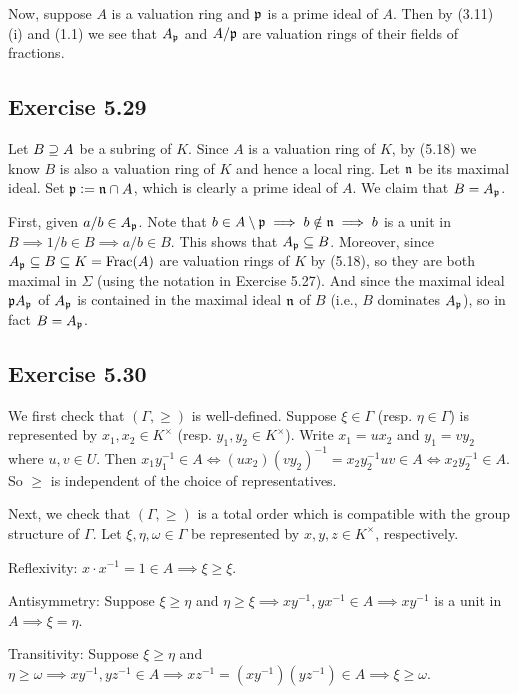 \documentclass[../A&M.tex]{subfiles}
\begin{document}
Now, suppose $A$ is a valuation ring and $\mathfrak{p}$ is a prime ideal of $A$. Then by (3.11) (i) and (1.1) we see that $A_{\mathfrak{p}}$ and $A/\mathfrak{p}$ are valuation rings of their fields of fractions.

\subsection*{Exercise 5.29}

Let $B \supseteq A$ be a subring of $K$. Since $A$ is a valuation ring of $K$, by (5.18) we know $B$ is also a valuation ring of $K$ and hence a local ring. Let $\mathfrak{n}$ be its maximal ideal. Set $\mathfrak{p} := \mathfrak{n} \cap A$, which is clearly a prime ideal of $A$. We claim that $B = A_{\mathfrak{p}}$.

First, given $a/b \in A_{\mathfrak{p}}$. Note that $b \in A \setminus \mathfrak{p} \implies b \notin \mathfrak{n} \implies b$ is a unit in $B \implies 1/b \in B \implies a/b \in B$. This shows that $A_{\mathfrak{p}} \subseteq B$. Moreover, since $A_{\mathfrak{p}} \subseteq B \subseteq K = \operatorname{Frac}(A)$ are valuation rings of $K$ by (5.18), so they are both maximal in $\Sigma$ (using the notation in Exercise 5.27). And since the maximal ideal $\mathfrak{p} A_{\mathfrak{p}}$ of $A_{\mathfrak{p}}$ is contained in the maximal ideal $\mathfrak{n}$ of $B$ (i.e., $B$ dominates $A_{\mathfrak{p}}$), so in fact $B = A_{\mathfrak{p}}$.

\subsection*{Exercise 5.30}

We first check that $(\Gamma,\geq)$ is well-defined. Suppose $\xi \in \Gamma$ (resp. $\eta \in \Gamma$) is represented by $x_1,x_2 \in K^\times$ (resp. $y_1,y_2 \in K^\times$). Write $x_1=ux_2$ and $y_1=vy_2$ where $u,v \in U$. Then $x_1y_1^{-1} \in A \iff (ux_2)(vy_2)^{-1} = x_2y_2^{-1} uv \in A \iff x_2y_2^{-1} \in A$. So $\geq$ is independent of the choice of representatives.

Next, we check that $(\Gamma,\geq)$ is a total order which is compatible with the group structure of $\Gamma$. Let $\xi,\eta,\omega \in \Gamma$ be represented by $x,y,z \in K^\times$, respectively.

Reflexivity: $x \cdot x^{-1} = 1 \in A \implies \xi \geq \xi$. 

Antisymmetry: Suppose $\xi \geq \eta$ and $\eta \geq \xi \implies xy^{-1}, yx^{-1} \in A \implies xy^{-1}$ is a unit in $A \implies \xi = \eta$.

Transitivity: Suppose $\xi \geq \eta$ and $\eta \geq \omega \implies xy^{-1} , yz^{-1} \in A \implies xz^{-1} = (xy^{-1})(yz^{-1}) \in A \implies \xi \geq \omega$.
\end{document}
